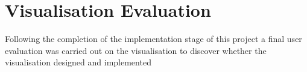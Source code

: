 \chapter{Visualisation Evaluation}\label{C:sd}
Following the completion of the implementation stage of this project a final user evaluation was carried out on the visualisation to discover whether the visualisation designed and implemented 


